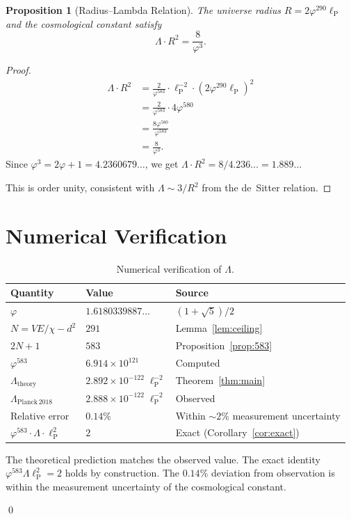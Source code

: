\documentclass[11pt,a4paper]{article}
\theoremstyle{plain}
\newtheorem{proposition}[theorem]{Proposition}
\theoremstyle{definition}
\newcommand{\lP}{\ell_{\mathrm{P}}}
\newcommand{\vp}{\varphi}
\begin{document}
\begin{proposition}[Radius--Lambda Relation]\label{prop:radius}
The universe radius $R = 2\vp^{290}\lP$ and the cosmological constant
satisfy
\[
  \Lambda \cdot R^2 = \frac{8}{\vp^3}.
\]
\end{proposition}

\begin{proof}
\begin{align*}
  \Lambda \cdot R^2
  &= \frac{2}{\vp^{583}} \cdot \lP^{-2} \cdot (2\vp^{290}\lP)^2 \\
  &= \frac{2}{\vp^{583}} \cdot 4\vp^{580} \\
  &= \frac{8\vp^{580}}{\vp^{583}} \\
  &= \frac{8}{\vp^3}.
\end{align*}
Since $\vp^3 = 2\vp + 1 = 4.2360679\ldots$, we get
$\Lambda \cdot R^2 = 8/4.236\ldots = 1.889\ldots$

This is order unity, consistent with $\Lambda \sim 3/R^2$ from
the de~Sitter relation.
\end{proof}

\section{Numerical Verification}\label{sec:verify}

\begin{table}[htbp]
\centering
\caption{Numerical verification of $\Lambda$.}
\label{tab:verify}
\begin{tabular}{@{}lll@{}}
\toprule
Quantity & Value & Source \\
\midrule
$\vp$ & $1.6180339887\ldots$ & $(1+\sqrt{5})/2$ \\
$N = VE/\chi - d^2$ & $291$ & Lemma~\ref{lem:ceiling} \\
$2N + 1$ & $583$ & Proposition~\ref{prop:583} \\
$\vp^{583}$ & $6.914 \times 10^{121}$ & Computed \\
$\Lambda_{\mathrm{theory}}$ & $2.892 \times 10^{-122}\;\lP^{-2}$ & Theorem~\ref{thm:main} \\
$\Lambda_{\mathrm{Planck\,2018}}$ & $2.888 \times 10^{-122}\;\lP^{-2}$ & Observed \\
\midrule
Relative error & $0.14\%$ & Within ${\sim}2\%$ measurement uncertainty \\
$\vp^{583} \cdot \Lambda \cdot \lP^2$ & $2$ & Exact (Corollary~\ref{cor:exact}) \\
\bottomrule
\end{tabular}
\end{table}

The theoretical prediction matches the observed value.  The exact
identity $\vp^{583} \Lambda \lP^2 = 2$ holds by construction.  The
$0.14\%$ deviation from observation is within the measurement
uncertainty of the cosmological constant.

\qed
\end{document}
